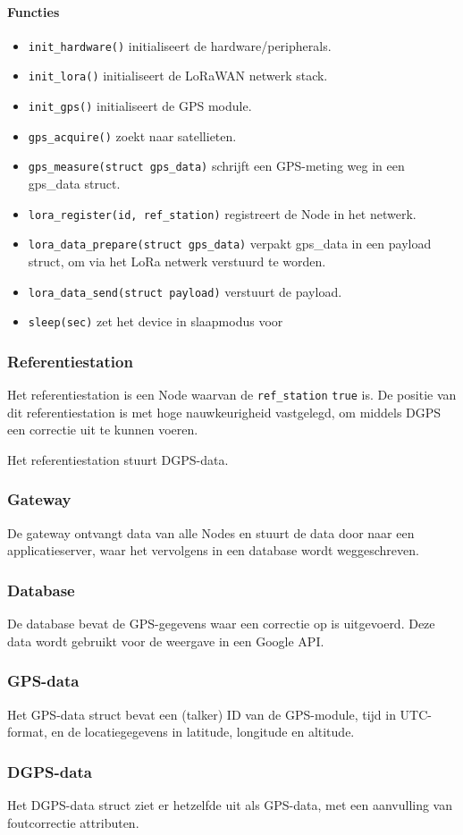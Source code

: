 \paragraph{Functies}
\begin{itemize}
    \item \texttt{init\_hardware()} initialiseert de hardware/peripherals.
    \item \texttt{init\_lora()} initialiseert de LoRaWAN netwerk stack.
    \item \texttt{init\_gps()} initialiseert de GPS module.
    \item \texttt{gps\_acquire()} zoekt naar satellieten.
    \item \texttt{gps\_measure(struct gps\_data)} schrijft een GPS-meting weg in een gps\_data struct.
    \item \texttt{lora\_register(id, ref\_station)} registreert de Node in het netwerk.
    \item \texttt{lora\_data\_prepare(struct gps\_data)} verpakt gps\_data in een payload struct, om via het LoRa netwerk verstuurd te worden.
    \item \texttt{lora\_data\_send(struct payload)} verstuurt de payload.
    \item \texttt{sleep(sec)} zet het device in slaapmodus voor
\end{itemize}

\subsubsection{Referentiestation}
Het referentiestation is een Node waarvan de \texttt{ref\_station} \texttt{true} is. De positie van dit referentiestation is met hoge nauwkeurigheid vastgelegd, om middels DGPS een correctie uit te kunnen voeren.

Het referentiestation stuurt DGPS-data.

\subsubsection{Gateway}
De gateway ontvangt data van alle Nodes en stuurt de data door naar een applicatieserver, waar het vervolgens in een database wordt weggeschreven.

\subsubsection{Database}
De database bevat de GPS-gegevens waar een correctie op is uitgevoerd. Deze data wordt gebruikt voor de weergave in een Google API.

\subsubsection{GPS-data}
Het GPS-data struct bevat een (talker) ID van de GPS-module, tijd in UTC-format, en de locatiegegevens in latitude, longitude en altitude.

\subsubsection{DGPS-data}
Het DGPS-data struct ziet er hetzelfde uit als GPS-data, met een aanvulling van foutcorrectie attributen.